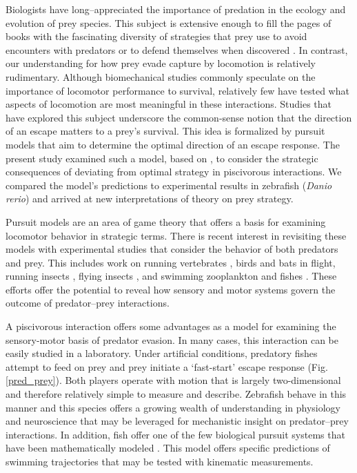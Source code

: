 \documentclass[12pt]{article}
\begin{document}
Biologists have long--appreciated the importance of predation in the ecology and evolution of prey species. This subject is extensive enough to fill the pages of books with the fascinating diversity of strategies that prey use to avoid encounters with predators \citep[e.g.][]{Ruxton:2004vb} or to defend themselves when discovered \citep[e.g.][]{Emlen:2014wb, Evans:1990va}. 
In contrast, our understanding for how prey evade capture by locomotion is relatively rudimentary. Although biomechanical studies commonly speculate on the importance of locomotor performance to survival, relatively few have tested what aspects of locomotion are most meaningful in these interactions. 
Studies that have explored this subject \citep[reviewed by][]{Domenici:2011tv} underscore the common-sense notion that the direction of an escape matters to a prey's survival. This idea is formalized by pursuit models that aim to determine the optimal direction of an escape response. 
The present study examined such a model, based on \cite{Weihs:1984tb}, to consider the strategic consequences of deviating from optimal strategy in piscivorous interactions. We compared the model's predictions to experimental results in zebrafish (\textit{Danio rerio}) \citep{Stewart:2014cm} and arrived at new interpretations of theory on prey strategy.

Pursuit models are an area of game theory that offers a basis for examining locomotor behavior in strategic terms. There is recent interest in revisiting these models \citep[e.g.][]{Howland:1974, Weihs:1984tb} with experimental studies that consider the behavior of both predators and prey. 
This includes work on running vertebrates \citep[e.g.][]{Wilson:2014fd}, birds \citep[e.g.][]{Hedenstrom:2001do, Kullberg:1998ur} and bats \citep[e.g.][]{Ghose:2006dk} in flight, running insects \citep{Domenici:2008kra}, flying insects \citep[e.g.][]{Combes:2012eta}, and swimming zooplankton \citep[e.g.][]{Arnott:1999wx, Heuch:2007kk} and fishes \citep[e.g.][]{Domenici:2000un}. 
These efforts offer the potential to reveal how sensory and motor systems govern the outcome of predator--prey interactions. 

A piscivorous interaction offers some advantages as a model for examining the sensory-motor basis of predator evasion. In many cases, this interaction can be easily studied in a laboratory. 
Under artificial conditions, predatory fishes attempt to feed on prey and prey initiate a `fast-start' escape response (Fig. \ref{pred_prey}). Both players operate with motion that is largely two-dimensional and therefore relatively simple to measure and describe. 
Zebrafish behave in this manner \citep{Stewart:2013bh} and this species offers a growing wealth of understanding in physiology and neuroscience \citep[e.g.][]{McLean:2011gi, Briggs:2002uf} that may be leveraged for mechanistic insight on predator--prey interactions. 
In addition, fish offer one of the few biological pursuit systems that have been mathematically modeled \citep{Weihs:1984tb}. This model offers specific predictions of swimming trajectories that may be tested with kinematic measurements. 
\end{document}
